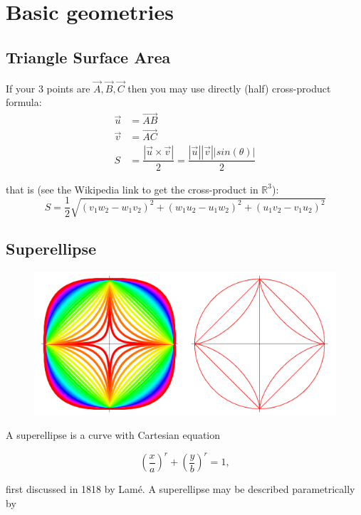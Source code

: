 
\chapter{Basic geometries}

\section{Triangle Surface Area}
If your \num{3} points are $ \vec{A}, \vec{B}, \vec{C} $ then you may use directly (half) cross-product formula:
\begin{align}
\vec{u} &= \vec{AB} \\
\vec{v} &= \vec{AC} \\
S &= \dfrac{|\vec{u} \times \vec{v}|}{2} = \dfrac{|\vec{u}||\vec{v}||sin(\theta)|}{2}
\end{align}

that is (see the Wikipedia link to get the cross-product in $ \mathbb{R}^3 $):
\begin{equation*}
S = \dfrac{1}{2} \sqrt{(v_1 w_2 - w_1 v_2)^2 + (w_1 u_2 - u_1 w_2)^2 + (u_1 v_2 - v_1 u_2)^2}
\end{equation*}

\section{Superellipse}
\begin{figure}[!h]
	\centering
	\includegraphics[width=0.7\linewidth]{Figures/Superellipses_1001}
	\caption{}
	\label{fig:superellipses1001}
\end{figure}

A superellipse is a curve with Cartesian equation

\begin{equation}
\left( \dfrac{x}{a} \right) ^ r + \left( \dfrac{y}{b} \right) ^ r = 1,
\end{equation}

first discussed in 1818 by Lamé. A superellipse may be described parametrically by

